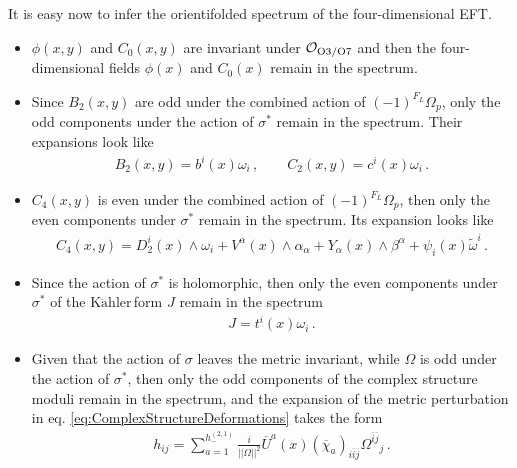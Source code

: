 \documentclass[12pt,a4paper]{book}
\newcommand{\Kahler}{\ensuremath{\text{K}\ddot{\text{a}}\text{hler}\,}}
\begin{document}
It is easy now to infer the orientifolded spectrum of the four-dimensional EFT.
\begin{itemize}
\item $\phi(x,y)$ and $C_0(x,y)$ are invariant under $\mathcal{O}_{\rm O3/O7}$ and then the four-dimensional fields $\phi(x)$ and $C_0(x)$ remain in the spectrum.
\item Since $B_2(x,y)$ are odd under the combined action of $\left(-1\right)^{F_L} \Omega_p$, only the odd components under the action of $\sigma^*$ remain in the spectrum. Their expansions look like
\begin{align}
\label{eq:OrientifoldedB2C2}
B_2(x,y) = b^i(x) \omega_i\,, \qquad C_2(x,y) = c^i(x) \omega_i \,.
\end{align}
\item $C_4(x,y)$ is even under the combined action of $\left(-1\right)^{F_L} \Omega_p$, then only the even components under $\sigma^*$ remain in the spectrum. Its expansion looks like
\begin{align}
\label{eq:OrientifoldedC4}
C_4(x,y) = D_2^i(x) \wedge \omega_i + V^\alpha(x) \wedge \alpha_\alpha + Y_\alpha(x) \wedge \beta^\alpha + \psi_i(x) \tilde{\omega}^i \,.
\end{align}
\item Since the action of $\sigma^*$ is holomorphic, then only the even components under $\sigma^*$ of the \Kahler form $J$ remain in the spectrum
\begin{align}
\label{eq:OrientifoldedJ}
J = t^i(x) \omega_i \,.
\end{align}
\item Given that the action of $\sigma$ leaves the metric invariant, while $\Omega$ is odd under the action of $\sigma^*$, then only the odd components of the complex structure moduli remain in the spectrum, and the expansion of the metric perturbation in eq. \eqref{eq:ComplexStructureDeformations} takes the form
\begin{align}
\label{eq:OrientifoldedComplexStructure}
h_{ij} = \sum_{a = 1}^{h_-^{(2,1)}} \frac{i}{||\Omega||^2} \overline{U}^a(x) \left(\overline{\chi}_a\right)_{i \overline{i} \overline{j}} {\Omega^{\overline{i} \overline{j}}}_j \,.
\end{align}
\end{itemize}
\end{document}
